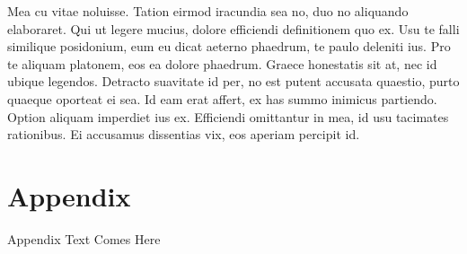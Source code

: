 Mea cu vitae noluisse. Tation eirmod iracundia sea no, duo no aliquando elaboraret. Qui ut legere mucius, dolore efficiendi definitionem quo ex. Usu te falli similique posidonium, eum eu dicat aeterno phaedrum, te paulo deleniti ius. Pro te aliquam platonem, eos ea dolore phaedrum. Graece honestatis sit at, nec id ubique legendos.
Detracto suavitate id per, no est putent accusata quaestio, purto quaeque oporteat ei sea. Id eam erat affert, ex has summo inimicus partiendo. Option aliquam imperdiet ius ex. Efficiendi omittantur in mea, id usu tacimates rationibus. Ei accusamus dissentias vix, eos aperiam percipit id.

\renewcommand\bibname{References} %

\chapter*{Appendix}
Appendix Text Comes Here


